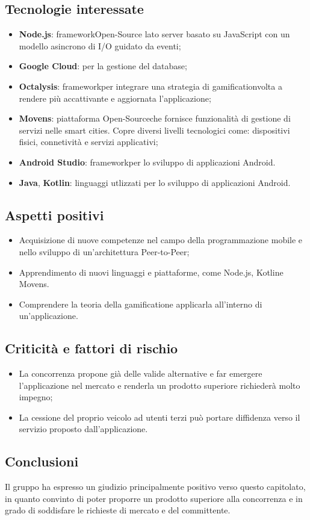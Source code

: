 \subsection{Tecnologie interessate}
\begin{itemize}
	\item \textbf{Node.js\glosp}: framework\glosp Open-Source lato server basato su JavaScript con un modello asincrono di I/O guidato da eventi;
	\item \textbf{Google Cloud}: per la gestione del database;
	\item \textbf{Octalysis\glosp}: framework\glosp per integrare una strategia di gamification\glosp volta a rendere più accattivante e aggiornata l'applicazione;
	\item \textbf{Movens\glosp}: piattaforma Open-Source\glosp che fornisce funzionalità di gestione di servizi nelle smart cities. Copre diversi livelli tecnologici come: dispositivi fisici, connetività e servizi applicativi;	
	\item \textbf{Android Studio}: framework\glosp per lo sviluppo di applicazioni Android.
	\item \textbf{Java}, \textbf{Kotlin\glosp}: linguaggi utlizzati per lo sviluppo di applicazioni Android.
\end{itemize}
\subsection{Aspetti positivi}
\begin{itemize}
	\item Acquisizione di nuove competenze nel campo della programmazione mobile e nello sviluppo di un'architettura Peer-to-Peer\glosp;
	\item Apprendimento di nuovi linguaggi e piattaforme, come Node.js\glo, Kotlin\glosp e Movens\glosp.
	\item Comprendere la teoria della gamification\glosp e applicarla all'interno di un'applicazione.
\end{itemize}
\subsection{Criticità e fattori di rischio}
\begin{itemize}
	\item La concorrenza propone già delle valide alternative e far emergere l'applicazione nel mercato e renderla un prodotto superiore richiederà molto impegno;
	\item La cessione del proprio veicolo ad utenti terzi può portare diffidenza verso il servizio proposto dall'applicazione.
\end{itemize}
\subsection{Conclusioni}
Il gruppo ha espresso un giudizio principalmente positivo verso questo capitolato\glosp,
in quanto convinto di poter proporre un prodotto superiore alla concorrenza e in grado di soddisfare le richieste di mercato e del committente.